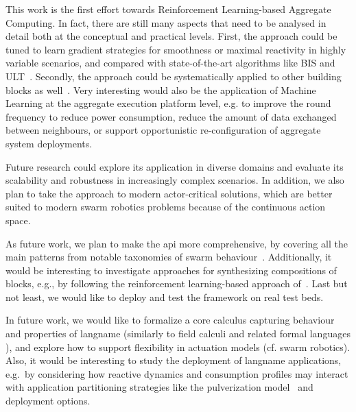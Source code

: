 This work is the first effort towards Reinforcement Learning-based Aggregate Computing.
%
In fact, there are still many aspects that need to be analysed in detail both at the conceptual and practical levels.
%
First, the approach could be tuned to learn gradient strategies for smoothness or maximal reactivity in highly variable scenarios, and compared with state-of-the-art algorithms like BIS and ULT~\cite{DBLP:conf/saso/AudritoCDV17}. 
%
Secondly, the approach could be systematically applied to other building blocks as well~\cite{DBLP:journals/jlap/ViroliBDACP19}.
%
Very interesting would also be the application of Machine Learning at the aggregate execution platform level, e.g. to improve the round frequency to reduce power consumption, reduce the amount of data exchanged between neighbours, or support opportunistic re-configuration of aggregate system deployments.
%



Future research could explore its application in diverse domains and evaluate its scalability and robustness in increasingly complex scenarios. 
%
In addition, we also plan to take the approach to modern actor-critical solutions, which are better suited to modern swarm robotics problems because of the continuous action space.

As future work,
 we plan to make the \ac{api} more comprehensive,
 by covering all the main patterns from notable taxonomies of swarm behaviour~\cite{DBLP:journals/swarm/BrambillaFBD13}.
%
Additionally, it would be interesting to investigate approaches for synthesizing compositions of \MacroSwarm{} blocks, e.g., by following the reinforcement learning-based approach of~\cite{DBLP:conf/coordination/AguzziCV22}.
%
Last but not least, we would like to deploy and test the framework on real test beds.

In future work,
 we would like to formalize a core calculus capturing behaviour and properties of \ac{langname} (similarly to field calculi and related formal languages \cite{vbdacp:ac:survey:jlamp,DBLP:conf/ecoop/AudritoCDSV22,DBLP:journals/lmcs/AudritoCDV23}),
 and explore how to support flexibility in actuation models (cf. swarm robotics).
Also, it would be interesting 
  to study the deployment of \ac{langname} applications, e.g.\ by considering how reactive dynamics and consumption profiles may interact with application partitioning strategies like the pulverization model~\cite{CPPVW-FI2020} and deployment options.

